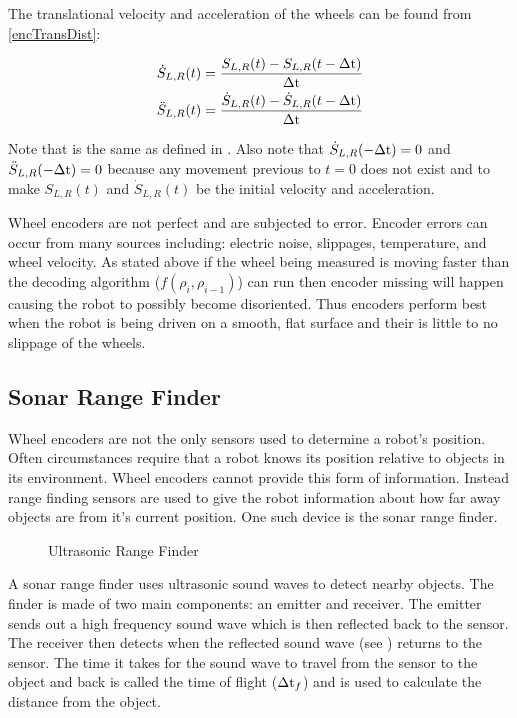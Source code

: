 \documentclass[main.tex]{subfiles}
\begin{document}
The translational velocity and acceleration of the wheels can be found from \eqref{encTransDist}:

\begin{eqnarray}
\label{eq:encTransSpeed}
\dot{S}_{L,R}(t) = \frac{S_{L,R}(t)-S_{L,R}(t-\Delta\mathrm{t})}{\Delta\mathrm{t}}
\\
\ddot{S}_{L,R}(t) = \frac{\dot{S}_{L,R}(t)-\dot{S}_{L,R}(t-\Delta\mathrm{t})}{\Delta\mathrm{t}}
\end{eqnarray}

Note that \delt is the same as defined in . Also note that
$\dot{S}_{L,R}(-\Delta\mathrm{t}) = 0$ and $\ddot{S}_{L,R}(-\Delta\mathrm{t}) = 0$ because any
movement previous to $t=0$ does not exist and to make $S_{L,R}(t)$ and
$\dot{S}_{L,R}(t)$ be the initial velocity and acceleration.

Wheel encoders are not perfect and are subjected to error. Encoder errors can
occur from many sources including: electric noise, slippages, temperature, and
wheel velocity. As stated above if the wheel being measured is moving faster
than the decoding algorithm ($f(\rho_i,\rho_{i-1})$) can run then encoder
missing will happen causing the robot to possibly become disoriented. Thus
encoders perform best when the robot is being driven on a smooth, flat surface
and their is little to no slippage of the wheels. 

\subsection{Sonar Range Finder}
Wheel encoders are not the only sensors used to determine a robot's position.
Often circumstances require that a robot knows its position relative to objects
in its environment. Wheel encoders cannot provide this form of information.
Instead range finding sensors are used to give the robot information about how
far away objects are from it's current position. One such device is the sonar
range finder. 

\begin{figure}[h]
	\begin{center}
		
	\end{center}
	\caption{Ultrasonic Range Finder}
	\label{fig:ultraSon}
\end{figure}

A sonar range finder uses ultrasonic sound waves to detect nearby objects. The
finder is made of two main components: an emitter and receiver. The emitter
sends out a high frequency sound wave which is then reflected back to the
sensor. The receiver then detects when the reflected sound wave (see
) returns to the sensor. The time it takes for the sound wave
to travel from the sensor to the object and back is called the time of flight
($\Delta\mathrm{t}_f$) and is used to calculate the distance from the object. 
\end{document}
